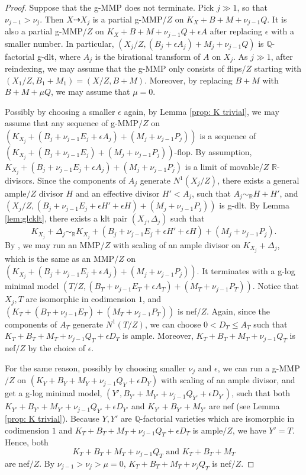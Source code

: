 \documentclass[11pt]{amsart}
\newcommand{\Rr}{\mathbb{R}}
\newcommand{\Qq}{\mathbb{Q}}
\begin{document}
\begin{proof}
	\noindent Suppose that the g-MMP does not terminate. Pick $j\gg 1$, so that $\nu_{j-1} >\nu_{j}$. Then $X\dashrightarrow X_j$ is a partial g-MMP/$Z$ on $K_{X}+B+M+\nu_{j-1}Q$. It is also a partial g-MMP/$Z$ on $K_{X}+B+M+\nu_{j-1}Q+\epsilon A$ after replacing $\epsilon$ with a smaller number. In particular, $(X_j/Z,(B_j+\epsilon A_j)+M_j+\nu_{j-1}Q)$ is $\Qq$-factorial g-dlt, where $A_j$ is the birational transform of $A$ on $X_j$. As $j \gg1$, after reindexing, we may assume that the g-MMP only consists of flips$/Z$ starting with $(X_1/Z,B_1+M_1)=(X/Z,B+M)$. Moreover, by replacing $B+M$ with $B+M+\mu Q$, we may assume that $\mu=0$.
		
	Possibly by choosing a smaller $\epsilon$ again, by Lemma \ref{prop: K trivial}, we may assume that any sequence of g-MMP$/Z$ on $(K_{X_{j}}+(B_j+\nu_{j-1} E_j + \epsilon A_j)+(M_j+\nu_{j-1} P_j))$  is a sequence of $(K_{X_j}+(B_j+\nu_{j-1}E_j)+(M_j+\nu_{j-1} P_j))$-flop. By assumption, $K_{X_j}+(B_j+\nu_{j-1} E_j +\epsilon A_j)+(M_j+\nu_{j-1}P_j)$ is a limit of movable$/Z$ $\Rr$-divisors. Since the components of $A_j$ generate $N^1(X_j/Z)$, there exists a general ample$/Z$ divisor $H$ and an effective divisor $H' < A_j$, such that $A_j \sim_\Rr H+H'$, and $(X_j/Z, (B_j+\nu_{j-1} E_j+\epsilon H' + \epsilon H)+(M_j+\nu_{j-1} P_j))$ is g-dlt. By Lemma \ref{lem:glcklt}, there exists a klt pair $(X_j, \Delta_j)$ such that
	\[
	 K_{X_j}+\Delta_j \sim_\Rr K_{X_j}+(B_j+\nu_{j-1} E_j + \epsilon H' + \epsilon H)+(M_j+\nu_{j-1} P_j).
	\] 
	By \cite{BCHM10}, we may run an MMP$/Z$ with scaling of an ample divisor on $K_{X_j}+\Delta_j$, which is the same as an MMP$/Z$ on $(K_{X_j}+(B_j+\nu_{j-1} E_j + \epsilon A_j)+(M_j+\nu_{j-1} P_j))$. It terminates with a g-log minimal model $(T/Z, (B_T+\nu_{j-1} E_T+\epsilon A_T)+ (M_T+ \nu_{j-1} P_T))$. Notice that $X_j, T$ are isomorphic in codimension $1$, and $(K_T+(B_T+\nu_{j-1} E_T)+ (M_T+ \nu_{j-1} P_T))$ is nef$/Z$. Again, since the components of $A_T$ generate $N^1(T/Z)$, we can choose $0 < D_T \leq A_T$ such that $K_{T}+B_T+M_T+\nu_{j-1}Q_T+\epsilon D_T$ is ample. Moreover, $K_T+B_T+M_T+\nu_{j-1} Q_T$ is nef$/Z$ by the choice of $\epsilon$.

For the same reason, possibly by choosing smaller $\nu_j$ and $\epsilon$, we can run a g-MMP$/Z$ on $(K_Y+B_Y+M_Y+\nu_{j-1}Q_Y+\epsilon D_Y)$ with scaling of an ample divisor, and get a g-log minimal model, $(Y', B_{Y'}+M_{Y'}+\nu_{j-1} Q_{Y'}+\epsilon D_{Y'})$, such that both $K_{Y'}+B_{Y'}+M_{Y'}+\nu_{j-1} Q_{Y'}+\epsilon D_{Y'}$ and $K_{Y'}+B_{Y'}+M_{Y'}$ are nef (see Lemma \ref{prop: K trivial}). Because $Y, Y'$ are $\Qq$-factorial varieties which are isomorphic in codimension $1$ and $K_{T}+B_T+M_T+\nu_{j-1}Q_T+\epsilon D_T$ is ample$/Z$,  we have $Y'=T$. Hence, both 
	\[
	K_T+B_T+M_T+\nu_{j-1} Q_T \text{~and~} K_T+B_T+M_T
	\] are nef$/Z$. By $\nu_{j-1}>\nu_{j}>\mu=0$, $K_T+B_T+M_T+\nu_{j}Q_T$ is nef$/Z$.


\end{proof}
\end{document}
